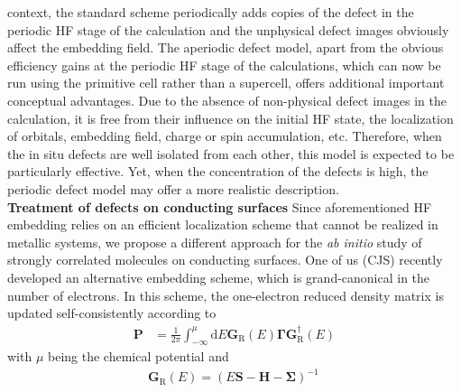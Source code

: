 \documentclass[a4paper,11pt,headings=normal]{scrartcl}
\begin{document}
context, the standard scheme periodically adds copies of the defect in the 
periodic HF stage of 
the calculation and the unphysical defect images obviously affect the embedding 
field. The aperiodic defect model, apart from the obvious efficiency gains at 
the periodic HF stage of the calculations, which can now be run using the 
primitive cell rather than a supercell, offers additional important conceptual 
advantages. Due to the absence of non-physical defect images in the 
calculation, it is free from their influence on the initial HF state, the localization of orbitals, embedding field, charge or spin accumulation, etc. Therefore, when the in situ defects are well isolated from each other, this model is expected to 
be particularly effective. Yet, when the concentration of the defects is high, the periodic defect model may offer a more realistic description.\\
\newpage
\noindent
\textbf{Treatment of defects on conducting surfaces}
Since aforementioned HF embedding relies on an efficient localization scheme that 
cannot be  realized in metallic systems, we propose a different approach for the 
\textit{ab initio} study of strongly correlated molecules on conducting surfaces. 
One of us (CJS) recently developed an alternative embedding scheme, which is 
grand-canonical 
in the number of electrons. In this scheme, the one-electron reduced density 
matrix is updated self-consistently according to
\begin{align}
\mathbf{P} &= \frac{1}{2\pi} \int_{-\infty}^{\mu} \text{d}E \mathbf{G}_\mathrm{R}(E) \mathbf{\Gamma} \mathbf{G}_\mathrm{R}^\dagger(E)
\label{eq_p}
\end{align}
with $\mu$ being the chemical potential and
\begin{align}
\mathbf{G}_\mathrm{R}(E) = \left( E \mathbf{S} - \mathbf{H} -\mathbf{\Sigma} \right)^{-1} \, 
\label{ret_green}
\end{align}
\end{document}

